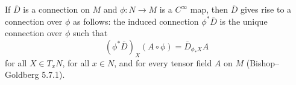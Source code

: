 If $\bar{D}$ is a connection on $M$ and $\phi: N \rightarrow M$ is a $C^\infty$ map, then $\bar{D}$ gives rise to a connection over $\phi$ as follows: the induced connection $\phi^* \bar{D}$ is the unique connection over $\phi$ such that
$$(\phi^* \bar{D})_X (A \circ \phi) = \bar{D}_{\phi_* X} A$$
for all $X \in T_x N$, for all $x \in N$, and for every tensor field $A$ on $M$ (Bishop--Goldberg 5.7.1).
